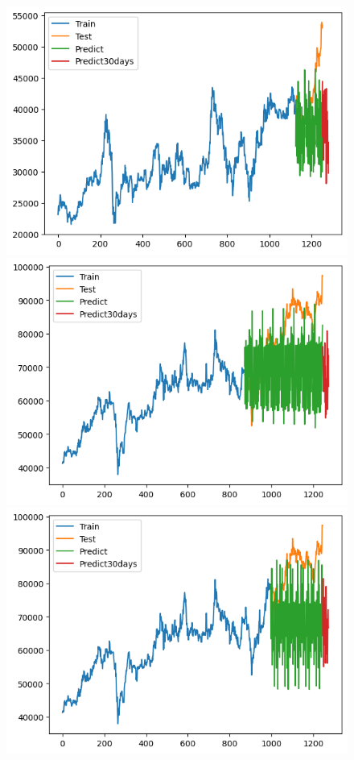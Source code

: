 \begin{figure}[H]
\begin{minipage}{0.15\textwidth}
    \centering
    \includegraphics[width=1\textwidth]{resources/chapter-5/result/BIDV_ML_9_1.png}
    \end{minipage}
    \hfill
    \begin{minipage}{0.15\textwidth}
    \centering
    \includegraphics[width=1\textwidth]{resources/chapter-5/result/VCB_ML_7_3.png}
    \end{minipage}
    \hfill
    \begin{minipage}{0.15\textwidth}
    \centering
    \includegraphics[width=1\textwidth]{resources/chapter-5/result/VCB_ML_8_2.png}

\end{minipage}
\end{figure}
